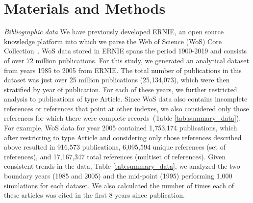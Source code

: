 \documentclass[NETN]{stjour}
\begin{document}
\section{Materials and Methods}
\emph{Bibliographic data} We have previously developed ERNIE, an open source knowledge platform into which we parse the Web of Science (WoS) Core Collection~\citep{Keserci371955}. WoS data stored in ERNIE spans the period 1900-2019 and consists of over 72 million publications. For this study, we generated an analytical dataset from years 1985 to 2005 from ERNIE. The total number of publications in this dataset was just over 25 million publications (25,134,073), which were then stratified by year of publication. For each of these years, we further restricted analysis to publications of type Article. Since WoS data also contains incomplete references or references that point at other indexes, we also considered only those references for which there were complete records~(Table \ref{tab:summary_data}). For example, WoS data for year 2005 contained 1,753,174 publications, which after restricting to type Article and considering only those references described above resulted in 916,573 publications, 6,095,594 unique references (set of references), and 17,167,347 total references (multiset of references). Given consistent trends in the data, Table \ref{tab:summary_data}, we analyzed the two boundary years (1985 and 2005) and the mid-point (1995) performing 1,000 simulations for each dataset. We also calculated the number of times each of these articles was cited in the first 8 years since publication.
\end{document}
